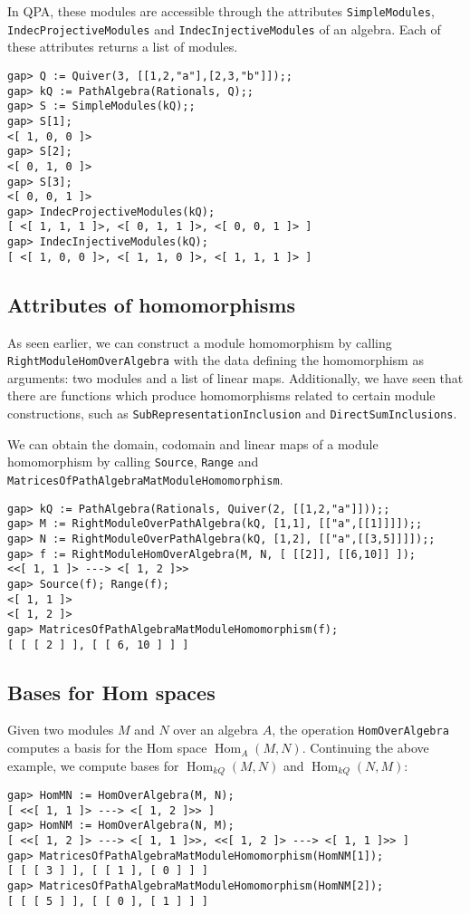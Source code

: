 \documentclass{amsart}
\newcommand{\Hom}{\operatorname{Hom}\nolimits}
\theoremstyle{definition}
\newcommand{\code}[1]{\texttt{#1}}
\theoremstyle{theoretic}
\begin{document}
In QPA, these modules are accessible through the attributes
\texttt{SimpleModules}, \texttt{IndecProjectiveModules} and
\texttt{IndecInjectiveModules} of an algebra.  Each of these
attributes returns a list of modules.
\begin{verbatim}
gap> Q := Quiver(3, [[1,2,"a"],[2,3,"b"]]);;
gap> kQ := PathAlgebra(Rationals, Q);;
gap> S := SimpleModules(kQ);;
gap> S[1];
<[ 1, 0, 0 ]>
gap> S[2];
<[ 0, 1, 0 ]>
gap> S[3];
<[ 0, 0, 1 ]>
gap> IndecProjectiveModules(kQ);
[ <[ 1, 1, 1 ]>, <[ 0, 1, 1 ]>, <[ 0, 0, 1 ]> ]
gap> IndecInjectiveModules(kQ);
[ <[ 1, 0, 0 ]>, <[ 1, 1, 0 ]>, <[ 1, 1, 1 ]> ]
\end{verbatim}

\subsection{Attributes of homomorphisms}

As seen earlier, we can construct a module homomorphism by calling
\texttt{RightModuleHomOverAlgebra} with the data defining the
homomorphism as arguments: two modules and a list of linear maps.
Additionally, we have seen that there are functions which produce
homomorphisms related to certain module constructions, such as
\texttt{SubRepresentationInclusion} and \texttt{DirectSumInclusions}.

We can obtain the domain, codomain and linear maps of a module
homomorphism by calling \texttt{Source}, \texttt{Range} and
\texttt{MatricesOfPathAlgebraMatModuleHomomorphism}.

\begin{verbatim}
gap> kQ := PathAlgebra(Rationals, Quiver(2, [[1,2,"a"]]));;
gap> M := RightModuleOverPathAlgebra(kQ, [1,1], [["a",[[1]]]]);;
gap> N := RightModuleOverPathAlgebra(kQ, [1,2], [["a",[[3,5]]]]);;
gap> f := RightModuleHomOverAlgebra(M, N, [ [[2]], [[6,10]] ]);
<<[ 1, 1 ]> ---> <[ 1, 2 ]>>
gap> Source(f); Range(f);
<[ 1, 1 ]>
<[ 1, 2 ]>
gap> MatricesOfPathAlgebraMatModuleHomomorphism(f);
[ [ [ 2 ] ], [ [ 6, 10 ] ] ]
\end{verbatim}

\subsection{Bases for Hom spaces}

Given two modules $M$ and $N$ over an algebra $A$, the operation
\code{HomOverAlgebra} computes a basis for the Hom space $\Hom_A(M,
N)$.  Continuing the above example, we compute bases for $\Hom_{kQ}(M,
N)$ and $\Hom_{kQ}(N, M)$:
\begin{verbatim}
gap> HomMN := HomOverAlgebra(M, N);
[ <<[ 1, 1 ]> ---> <[ 1, 2 ]>> ]
gap> HomNM := HomOverAlgebra(N, M);
[ <<[ 1, 2 ]> ---> <[ 1, 1 ]>>, <<[ 1, 2 ]> ---> <[ 1, 1 ]>> ]
gap> MatricesOfPathAlgebraMatModuleHomomorphism(HomNM[1]);
[ [ [ 3 ] ], [ [ 1 ], [ 0 ] ] ]
gap> MatricesOfPathAlgebraMatModuleHomomorphism(HomNM[2]);
[ [ [ 5 ] ], [ [ 0 ], [ 1 ] ] ]
\end{verbatim}
\end{document}
